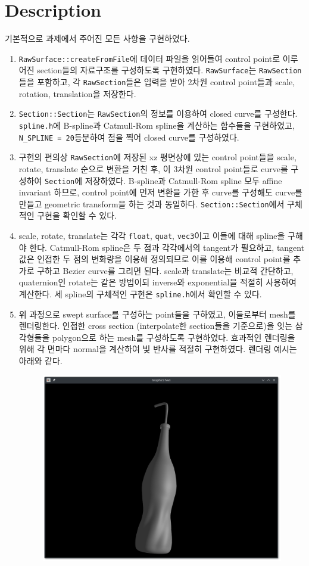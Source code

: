 \documentclass[11pt]{oblivoir}
\begin{document}
\section{Description}
기본적으로 과제에서 주어진 모든 사항을 구현하였다.
\begin{enumerate}
\item
  \verb|RawSurface::createFromFile|에 데이터 파일을 읽어들여 control point로 이루어진 section들의 자료구조를 구성하도록 구현하였다.
  \verb|RawSurface|는 \verb|RawSection|들을 포함하고, 각 \verb|RawSection|들은 입력을 받아 2차원 control point들과 scale, rotation, translation을 저장한다.
\item
  \verb|Section::Section|는 \verb|RawSection|의 정보를 이용하여 closed curve를 구성한다. \verb|spline.h|에 B-spline과 Catmull-Rom spline을 계산하는 함수들을 구현하였고,
  \verb|N_SPLINE = 20|등분하여 점을 찍어 closed curve를 구성하였다.
\item
  구현의 편의상 \verb|RawSection|에 저장된 xz 평면상에 있는 control point들을 scale, rotate, translate 순으로 변환을 거친 후, 이 3차원 control point들로 curve를 구성하여 \verb|Section|에 저장하였다.
  B-spline과 Catmull-Rom spline 모두 affine invariant 하므로, control point에 먼저 변환을 가한 후 curve를 구성해도 curve를 만들고 geometric transform을 하는 것과 동일하다.
  \verb|Section::Section|에서 구체적인 구현을 확인할 수 있다.
\item
  scale, rotate, translate는 각각 \verb|float|, \verb|quat|, \verb|vec3|이고 이들에 대해 spline을 구해야 한다. Catmull-Rom spline은 두 점과 각각에서의 tangent가 필요하고, tangent 값은 인접한 두 점의 변화량을 이용해 정의되므로
  이를 이용해 control point를 추가로 구하고 Bezier curve를 그리면 된다. scale과 translate는 비교적 간단하고, quaternion인 rotate는 같은 방법이되 inverse와 exponential을 적절히 사용하여 계산한다.
  세 spline의 구체적인 구현은 \verb|spline.h|에서 확인할 수 있다.
\item
  위 과정으로 swept surface를 구성하는 point들을 구하였고, 이들로부터 mesh를 렌더링한다. 인접한 cross section (interpolate한 section들을 기준으로)을 잇는 삼각형들을 polygon으로 하는 mesh를 구성하도록 구현하였다.
  효과적인 렌더링을 위해 각 면마다 normal을 계산하여 빛 반사를 적절히 구현하였다. 렌더링 예시는 아래와 같다.
  \begin{figure}[H]
    \centering
    \includegraphics[width=0.75\linewidth]{coke.png}

\end{figure}
\end{enumerate}
\end{document}
